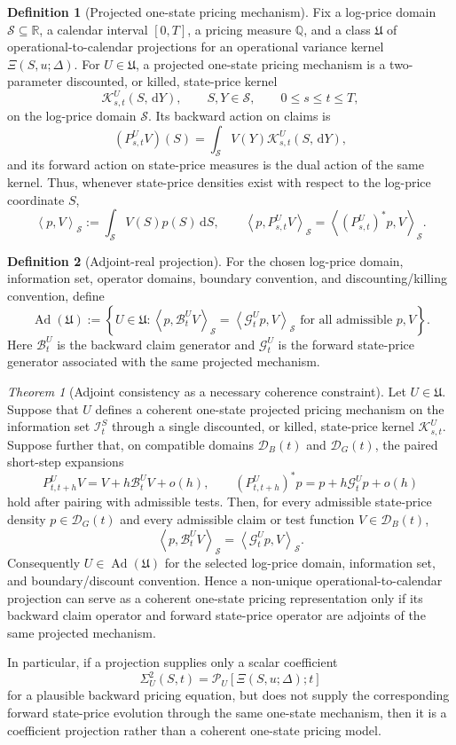 \documentclass[11pt]{amsart}
\newcommand{\Q}{\mathbb{Q}}
\newcommand{\dd}{\,\mathrm{d}}
\newcommand{\Xiop}{\Xi}
\newcommand{\Ad}{\operatorname{Ad}}
\newcommand{\Bop}{\mathcal{B}}
\newcommand{\Gop}{\mathcal{G}}
\newcommand{\Pproj}{\mathcal{P}}
\newcommand{\Kern}{\mathcal{K}}
\newcommand{\Sdom}{\mathcal S}
\newcommand{\Dclaim}{\mathcal{D}_{\!B}}
\newcommand{\Ddens}{\mathcal{D}_{\!G}}
\newcommand{\Ical}{\mathcal{I}}
\newcommand{\PairS}[2]{\left\langle #1,#2\right\rangle_{\Sdom}}
\theoremstyle{definition}
\newtheorem{definition}{Definition}
\theoremstyle{plain}
\theoremstyle{remark}
\newtheorem{theorem}{Theorem}
\begin{document}
\begin{definition}[Projected one-state pricing mechanism]
Fix a log-price domain $\Sdom\subseteq\mathbb R$, a calendar interval $[0,T]$, a pricing measure $\Q$, and a class $\mathfrak U$ of operational-to-calendar projections for an operational variance kernel $\Xiop(S,u;\Delta)$.  For $U\in\mathfrak U$, a projected one-state pricing mechanism is a two-parameter discounted, or killed, state-price kernel
\[
 \Kern^U_{s,t}(S,\dd Y),\qquad S,Y\in\Sdom,\qquad 0\leq s\leq t\leq T,
\]
on the log-price domain $\Sdom$.  Its backward action on claims is
\[
 (P^U_{s,t}V)(S)=\int_{\Sdom}V(Y)\Kern^U_{s,t}(S,\dd Y),
\]
and its forward action on state-price measures is the dual action of the same kernel.  Thus, whenever state-price densities exist with respect to the log-price coordinate $S$,
\[
 \PairS{p}{V}:=\int_{\Sdom}V(S)p(S)\dd S,
 \qquad
 \PairS{p}{P^U_{s,t}V}=\PairS{(P^U_{s,t})^*p}{V}.
\]
\end{definition}

\begin{definition}[Adjoint-real projection]
For the chosen log-price domain, information set, operator domains, boundary convention, and discounting/killing convention, define
\[
 \Ad(\mathfrak U)
 :=
 \left\{
 U\in\mathfrak U:
 \PairS{p}{\Bop_t^U V}=\PairS{\Gop_t^U p}{V}
 \text{ for all admissible } p,V
 \right\}.
\]
Here $\Bop_t^U$ is the backward claim generator and $\Gop_t^U$ is the forward state-price generator associated with the same projected mechanism.
\end{definition}

\begin{theorem}[Adjoint consistency as a necessary coherence constraint]
\label{thm:adjoint-consistency-v12}
Let $U\in\mathfrak U$.  Suppose that $U$ defines a coherent one-state projected pricing mechanism on the information set $\Ical_t^S$ through a single discounted, or killed, state-price kernel $\Kern^U_{s,t}$.  Suppose further that, on compatible domains $\Dclaim(t)$ and $\Ddens(t)$, the paired short-step expansions
\[
 P^U_{t,t+h}V=V+h\Bop^U_tV+o(h),\qquad
 (P^U_{t,t+h})^*p=p+h\Gop^U_tp+o(h)
\]
hold after pairing with admissible tests.  Then, for every admissible state-price density $p\in\Ddens(t)$ and every admissible claim or test function $V\in\Dclaim(t)$,
\begin{equation}
 \PairS{p}{\Bop^U_tV}=\PairS{\Gop^U_tp}{V}.
 \label{eq:adjoint-consistency-v12}
\end{equation}
Consequently $U\in\Ad(\mathfrak U)$ for the selected log-price domain, information set, and boundary/discount convention.  Hence a non-unique operational-to-calendar projection can serve as a coherent one-state pricing representation only if its backward claim operator and forward state-price operator are adjoints of the same projected mechanism.

In particular, if a projection supplies only a scalar coefficient
\[
 \Sigma_U^2(S,t)=\Pproj_U[\Xiop(S,u;\Delta);t]
\]
for a plausible backward pricing equation, but does not supply the corresponding forward state-price evolution through the same one-state mechanism, then it is a coefficient projection rather than a coherent one-state pricing model.
\end{theorem}
\end{document}

